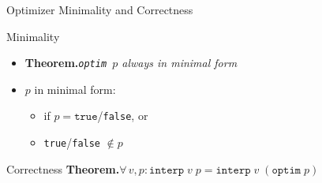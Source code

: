 \documentclass[aspectratio=169,xcolor=dvipsnames]{beamer}
\begin{document}
    \begin{frame}{Optimizer Minimality and Correctness}
        \begin{block}{Minimality}
            \begin{itemize}
                \item \textbf{Theorem.}\hspace*{8pt}\emph{\texttt{optim $p$} always in minimal form}
                \item $p$ in \alert{minimal form}:
                    \begin{itemize}
                        \item if $p = \texttt{true}$/\texttt{false}, or
                        \item \texttt{true}/\texttt{false} $\notin p$
                    \end{itemize}
            \end{itemize}
        \end{block}

        \pause

        \begin{block}{Correctness}
            \textbf{Theorem.}\hspace*{8pt}\emph{$\forall\,v, p : \texttt{interp}\;v\;p = \texttt{interp}\;v\;(\texttt{optim}\;p)$}
        \end{block}

    \end{frame}
\end{document}
